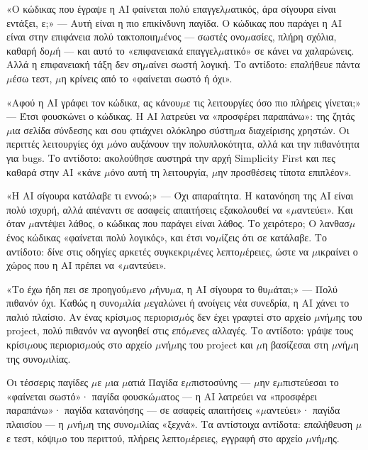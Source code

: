 
«Ο κώδικας που έγραψε η AI φαίνεται πολύ επαγγελ$\mu$ατικός, άρα σίγουρα είναι εντάξει, ε;» — Αυτή είναι η πιο επικίνδυνη παγίδα. Ο κώδικας που παράγει η AI είναι στην επιφάνεια πολύ τακτοποιη$\mu$ένος — σωστές ονο$\mu$ασίες, πλήρη σχόλια, καθαρή δο$\mu$ή — και αυτό το «επιφανειακά επαγγελ$\mu$ατικό» σε κάνει να χαλαρώνεις. Αλλά η επιφανειακή τάξη δεν ση$\mu$αίνει σωστή λογική. Το αντίδοτο: επαλήθευε πάντα $\mu$έσω τεστ, $\mu$η κρίνεις από το «φαίνεται σωστό ή όχι».


«Αφού η AI γράφει τον κώδικα, ας κάνου$\mu$ε τις λειτουργίες όσο πιο πλήρεις γίνεται;» — Έτσι φουσκώνει ο κώδικας. Η AI λατρεύει να «προσφέρει παραπάνω»: της ζητάς $\mu$ια σελίδα σύνδεσης και σου φτιάχνει ολόκληρο σύστη$\mu$α διαχείρισης χρηστών. Οι περιττές λειτουργίες όχι $\mu$όνο αυξάνουν την πολυπλοκότητα, αλλά και την πιθανότητα για bugs. Το αντίδοτο: ακολούθησε αυστηρά την αρχή Simplicity First και πες καθαρά στην AI «κάνε $\mu$όνο αυτή τη λειτουργία, $\mu$ην προσθέσεις τίποτα επιπλέον».


«Η AI σίγουρα κατάλαβε τι εννοώ;» — Όχι απαραίτητα. Η κατανόηση της AI είναι πολύ ισχυρή, αλλά απέναντι σε ασαφείς απαιτήσεις εξακολουθεί να «$\mu$αντεύει». Και όταν $\mu$αντέψει λάθος, ο κώδικας που παράγει είναι λάθος. Το χειρότερο; Ο λανθασ$\mu$ένος κώδικας «φαίνεται πολύ λογικός», και έτσι νο$\mu$ίζεις ότι σε κατάλαβε. Το αντίδοτο: δίνε στις οδηγίες αρκετές συγκεκρι$\mu$ένες λεπτο$\mu$έρειες, ώστε να $\mu$ικραίνει ο χώρος που η AI πρέπει να «$\mu$αντεύει».


«Το έχω ήδη πει σε προηγού$\mu$ενο $\mu$ήνυ$\mu$α, η AI σίγουρα το θυ$\mu$άται;» — Πολύ πιθανόν όχι. Καθώς η συνο$\mu$ιλία $\mu$εγαλώνει ή ανοίγεις νέα συνεδρία, η AI χάνει το παλιό πλαίσιο. Αν ένας κρίσι$\mu$ος περιορισ$\mu$ός δεν έχει γραφτεί στο αρχείο $\mu$νή$\mu$ης του project, πολύ πιθανόν να αγνοηθεί στις επό$\mu$ενες αλλαγές. Το αντίδοτο: γράψε τους κρίσι$\mu$ους περιορισ$\mu$ούς στο αρχείο $\mu$νή$\mu$ης του project και $\mu$η βασίζεσαι στη $\mu$νή$\mu$η της συνο$\mu$ιλίας.

\begin{tcbwarn}{Οι τέσσερις παγίδες $\mu$ε $\mu$ια $\mu$ατιά}
Παγίδα ε$\mu$πιστοσύνης — $\mu$ην ε$\mu$πιστεύεσαι το «φαίνεται σωστό»· παγίδα φουσκώ$\mu$ατος — η AI λατρεύει να «προσφέρει παραπάνω»· παγίδα κατανόησης — σε ασαφείς απαιτήσεις «$\mu$αντεύει»· παγίδα πλαισίου — η $\mu$νή$\mu$η της συνο$\mu$ιλίας «ξεχνά». Τα αντίστοιχα αντίδοτα: επαλήθευση $\mu$ε τεστ, κόψι$\mu$ο του περιττού, πλήρεις λεπτο$\mu$έρειες, εγγραφή στο αρχείο $\mu$νή$\mu$ης.

\end{tcbwarn}

